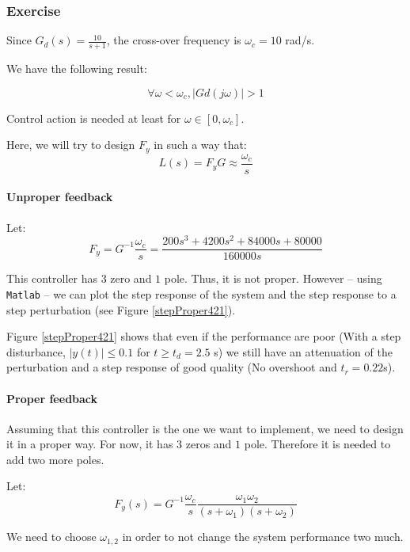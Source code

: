 \subsubsection{Exercise}
\label{exo421}

Since $G_d(s) = \frac{10}{s+1}$, the cross-over frequency is $\omega_c = 10$ rad/s.

We have the following result:

$$\forall \omega < \omega_c, |Gd(j\omega)| >1$$

Control action is needed at least for $\omega \in [0,\omega_c]$.

Here, we will try to design $F_y$ in such a way that:
$$L(s) = F_y G \approx \frac{\omega_c}{s}$$

\paragraph{Unproper feedback}
Let:
$$F_y = G^{-1} \frac{\omega_c}{s} = \frac{200 s^3 + 4200 s^2 + 84000 s + 80000}{160000 s}$$

This controller has $3$ zero and $1$ pole.
Thus, it is not proper.
However -- using \texttt{Matlab} -- we can plot the step response of the system and the step response to a step perturbation (see Figure \ref{stepProper421}).

 
Figure \ref{stepProper421} shows that even if the performance are poor (With a step disturbance, $|y(t)| \leq 0.1$ for $t \geq t_d = 2.5$ s) we still have an attenuation of the perturbation and a step response of good quality (No overshoot and $t_r = 0.22$s).

\paragraph{Proper feedback}
Assuming that this controller is the one we want to implement, we need to design it in a proper way.
For now, it has $3$ zeros and $1$ pole.
Therefore it is needed to add two more poles.

Let:
$$F_y(s) = G^{-1}\frac{\omega_c}{s} \frac{\omega_1 \omega_2}{(s+\omega_1)(s+\omega_2)}$$

We need to choose $\omega_{1,2}$ in order to not change the system performance two much.


